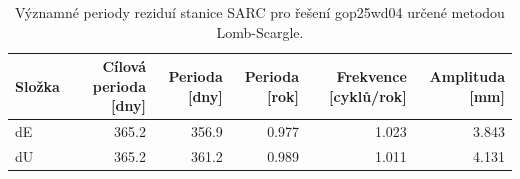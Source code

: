 \begin{table}[H]
\centering
\caption{Významné periody reziduí stanice SARC pro řešení gop25wd04 určené metodou Lomb-Scargle.}
\label{tab:gop25wd04_stcd_sarc_detr_weighted_multiseg_spectral_lomb_scargle_significant_periods}
\begin{tabular}{lrrrrr}
\toprule
Složka & Cílová perioda [dny] & Perioda [dny] & Perioda [rok] & Frekvence [cyklů/rok] & Amplituda [mm] \\
\midrule
dE & 365.2 & 356.9 & 0.977 & 1.023 & 3.843 \\
dU & 365.2 & 361.2 & 0.989 & 1.011 & 4.131 \\
\bottomrule
\end{tabular}
\end{table}
